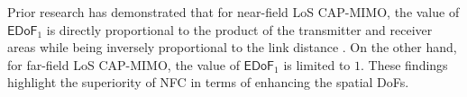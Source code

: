\documentclass[journal]{IEEEtran}
\theoremstyle{definition}
\begin{document}
Prior research has demonstrated that for near-field LoS CAP-MIMO, the value of ${\mathsf{EDoF}}_1$ is directly proportional to the product of the transmitter and receiver areas while being inversely proportional to the link distance \cite{Poon2005,Dardari2020,Pizzo2023}. On the other hand, for far-field LoS CAP-MIMO, the value of ${\mathsf{EDoF}}_1$ is limited to $1$. These findings highlight the superiority of NFC in terms of enhancing the spatial DoFs.
\begin{table}[!h]
\caption{Summary of DoF-related metrics for MIMO NFC supported by CAP antennas.}
\label{table_cap}
\small
\centering
\begin{threeparttable}
\end{threeparttable}
\end{table}
\end{document}
